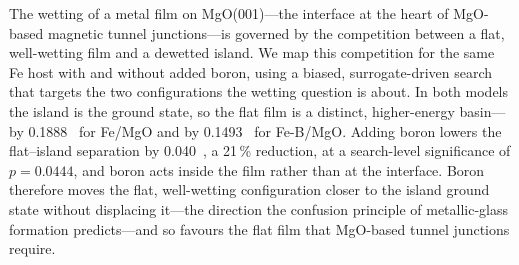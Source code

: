The wetting of a metal film on MgO(001)---the interface at the heart of MgO-based magnetic tunnel
junctions---is governed by the competition between a flat, well-wetting film and a dewetted island.
We map this competition for the same Fe host with and without added boron, using a biased,
surrogate-driven search that targets the two configurations the wetting question is about. In both
models the island is the ground state, so the flat film is a distinct, higher-energy basin---by
0.1888~\eVA{} for Fe/MgO and by 0.1493~\eVA{} for Fe-B/MgO. Adding boron lowers the
flat--island separation by 0.040~\eVA, a 21\,\% reduction, at a search-level significance of
$p = 0.0444$, and boron acts inside the film rather than at the interface. Boron therefore moves the
flat, well-wetting configuration closer to the island ground state without displacing it---the
direction the confusion principle of metallic-glass formation predicts---and so favours the flat film
that MgO-based tunnel junctions require.
